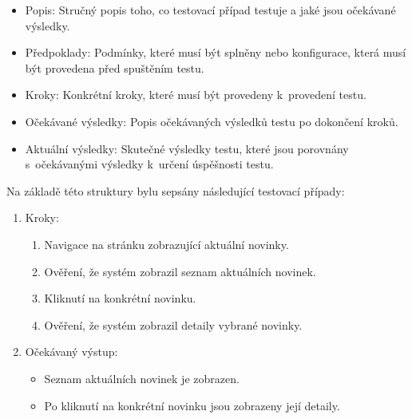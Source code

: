 \begin{itemize}
  \item Popis: Stručný popis toho, co testovací případ testuje a jaké jsou očekávané výsledky.
  \item Předpoklady: Podmínky, které musí být splněny nebo konfigurace, která musí být provedena před spuštěním testu.
  \item Kroky: Konkrétní kroky, které musí být provedeny k~provedení testu.
  \item Očekávané výsledky: Popis očekávaných výsledků testu po dokončení kroků.
  \item Aktuální výsledky: Skutečné výsledky testu, které jsou porovnány s~očekávanými výsledky k~určení úspěšnosti testu.
\end{itemize}

Na základě této struktury bylu sepsány následující testovací případy:



\begin{enumerate}
  \item Kroky:
    \begin{enumerate}
      \item Navigace na stránku zobrazující aktuální novinky.
      \item Ověření, že systém zobrazil seznam aktuálních novinek.
      \item Kliknutí na konkrétní novinku.
      \item Ověření, že systém zobrazil detaily vybrané novinky.
    \end{enumerate}
  \item Očekávaný výstup:
    \begin{itemize}
      \item Seznam aktuálních novinek je zobrazen.
      \item Po kliknutí na konkrétní novinku jsou zobrazeny její detaily.
    \end{itemize}
\end{enumerate}


